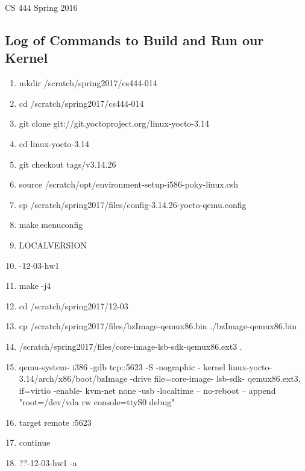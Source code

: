 \documentclass[letterpaper,10pt,draftclsnofoot,onecolumn]{IEEEtran}
\title{\team \assign}
\author{\name}
\def\course{CS 444 Spring 2016}
\begin{document}
\maketitle
\vspace*{10em}
\centering
\course
\vspace*{4em}
\begin{abstract} 
This document outlines our process in getting acquainted with kernel development. It also describes our solution to the
producer-consumer concurrency exercise. We used the Yocto project to build our custom kernel and relied on QEMU to provide a virtual environment in which to run our kernel.
\end{abstract}

\clearpage
\begin{flushleft}
\section{Log of Commands to Build and Run our Kernel}
\begin{enumerate}
	\item mkdir /scratch/spring2017/cs444-014
	\item cd /scratch/spring2017/cs444-014
	\item git clone git://git.yoctoproject.org/linux-yocto-3.14
	\item cd linux-yocto-3.14
	\item git checkout tags/v3.14.26
	\item source /scratch/opt/environment-setup-i586-poky-linux.csh
	\item cp /scratch/spring2017/files/config-3.14.26-yocto-qemu.config
	\item make menuconfig
	\item LOCALVERSION
	\item -12-03-hw1
	\item make -j4
	\item cd /scratch/spring2017/12-03
	\item cp /scratch/spring2017/files/bzImage-qemux86.bin ./bzImage-qemux86.bin
	\item /scratch/spring2017/files/core-image-lsb-sdk-qemux86.ext3 .
	\item qemu-system- i386 -gdb tcp::5623 -S -nographic - kernel linux-yocto- 
		3.14/arch/x86/boot/bzImage  -drive file=core-image- lsb-sdk- qemux86.ext3,
		if=virtio -enable- kvm-net none -usb -localtime -- no-reboot -- append
		"root=/dev/vda rw console=ttyS0 debug"
	\item target remote :5623
	\item continue
	\item ??-12-03-hw1 -a
\end{enumerate}


\end{flushleft}
\end{document}
